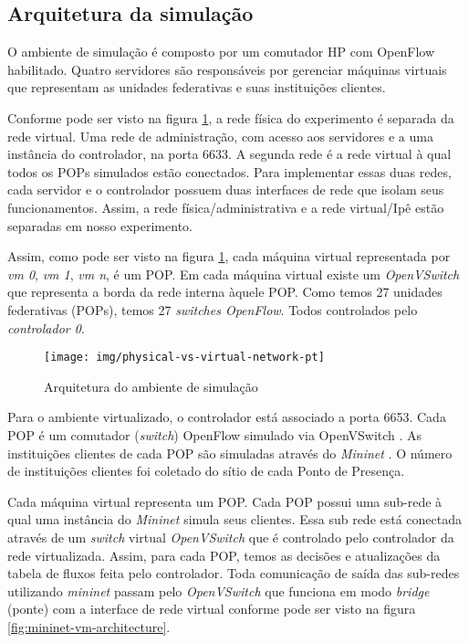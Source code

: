 
\subsection{Arquitetura da simulação}

O ambiente de simulação é composto por um comutador HP com OpenFlow habilitado.
Quatro servidores são responsáveis por gerenciar máquinas virtuais que
representam as unidades federativas e suas instituições clientes.

Conforme pode ser visto na figura \ref{fig:physical-vs-virtual-network}, a
rede física do experimento é separada da rede virtual.
Uma rede de administração, com acesso aos servidores e a uma instância do
controlador, na porta 6633.
A segunda rede é a rede virtual à qual todos os POPs simulados estão
conectados.
Para implementar essas duas redes, cada servidor e o controlador possuem duas
interfaces de rede que isolam seus funcionamentos.
Assim, a rede física/administrativa e a rede virtual/Ipê estão separadas
em nosso experimento.

Assim, como pode ser visto na figura \ref{fig:physical-vs-virtual-network},
cada máquina virtual representada por \emph{vm 0}, \emph{vm 1}, \emph{vm n},
é um POP.
Em cada máquina virtual existe um \emph{OpenVSwitch} que representa a borda
da rede interna àquele POP.
Como temos 27 unidades federativas (POPs), temos 27 \emph{switches OpenFlow}.
Todos controlados pelo \emph{controlador 0}.


\begin{figure}[!h]
    \centering
    \label{fig:physical-vs-virtual-network}
    \texttt{[image: img/physical-vs-virtual-network-pt]}
    \caption{Arquitetura do ambiente de simulação}
\end{figure}

Para o ambiente virtualizado, o controlador está associado a porta 6653.
Cada POP é um comutador (\emph{switch}) OpenFlow simulado via OpenVSwitch
\citep{openvswitch2015switch}.
As instituições clientes de cada POP são simuladas através do \emph{Mininet}
\citep{lantz2010network}.
O número de instituições clientes foi coletado do sítio de cada Ponto de
Presença.

Cada máquina virtual representa um POP.
Cada POP possui uma sub-rede à qual uma instância do \emph{Mininet} simula
seus clientes.
Essa sub rede está conectada através de um \emph{switch} virtual
\emph{OpenVSwitch} que é controlado pelo controlador da rede virtualizada.
Assim, para cada POP, temos as decisões e atualizações da tabela de fluxos
feita pelo controlador.
Toda comunicação de saída das sub-redes utilizando \emph{mininet} passam pelo
\emph{OpenVSwitch} que funciona em modo \emph{bridge} (ponte) com a interface
de rede virtual conforme pode ser visto na figura
\ref{fig:mininet-vm-architecture}.


